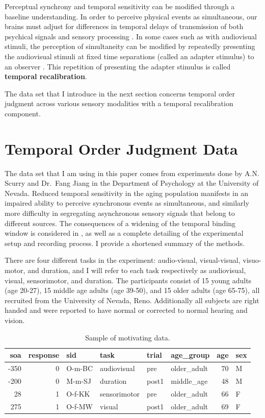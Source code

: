 \documentclass[11pt, oneside]{book}
\begin{document}
Perceptual synchrony and temporal sensitivity can be modified through a baseline understanding. In order to perceive physical events as simultaneous, our brains must adjust for differences in temporal delays of transmission of both psychical signals and sensory processing \citep{fujisaki2004recalibration}. In some cases such as with audiovisual stimuli, the perception of simultaneity can be modified by repeatedly presenting the audiovisual stimuli at fixed time separations (called an adapter stimulus) to an observer \citep{vroomen2004recalibration}. This repetition of presenting the adapter stimulus is called \textbf{temporal recalibration}.

The data set that I introduce in the next section concerns temporal order judgment across various sensory modalities with a temporal recalibration component.

\hypertarget{toj-task}{%
\section{Temporal Order Judgment Data}\label{toj-task}}

The data set that I am using in this paper comes from experiments done by A.N. Scurry and Dr.~Fang Jiang in the Department of Psychology at the University of Nevada. Reduced temporal sensitivity in the aging population manifests in an impaired ability to perceive synchronous events as simultaneous, and similarly more difficulty in segregating asynchronous sensory signals that belong to different sources. The consequences of a widening of the temporal binding window is considered in \citet{scurry2019aging}, as well as a complete detailing of the experimental setup and recording process. I provide a shortened summary of the methods.

There are four different tasks in the experiment: audio-visual, visual-visual, visuo-motor, and duration, and I will refer to each task respectively as audiovisual, visual, sensorimotor, and duration. The participants consist of 15 young adults (age 20-27), 15 middle age adults (age 39-50), and 15 older adults (age 65-75), all recruited from the University of Nevada, Reno. Additionally all subjects are right handed and were reported to have normal or corrected to normal hearing and vision.

\begin{table}[!h]

\caption{\label{tab:multitask-data}Sample of motivating data.}
\centering
\begin{tabular}[t]{rrllllrl}
\toprule
soa & response & sid & task & trial & age\_group & age & sex\\
\midrule
-350 & 0 & O-m-BC & audiovisual & pre & older\_adult & 70 & M\\
-200 & 0 & M-m-SJ & duration & post1 & middle\_age & 48 & M\\
28 & 1 & O-f-KK & sensorimotor & pre & older\_adult & 66 & F\\
275 & 1 & O-f-MW & visual & post1 & older\_adult & 69 & F\\
\bottomrule
\end{tabular}
\end{table}
\end{document}
